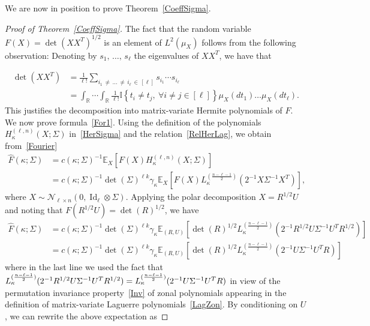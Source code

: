 \documentclass[AHL,Unicode,longabstracts,published]{cedram}
\DeclareMathOperator{\Id}{Id}
\newcommand{\scN}{\mathscr{N}}
\newcommand{\R}{\mathbb{R}}
\newcommand{\EX}[2]{\mathbb{E}_{#1}\left[#2\right]}
\newcommand{\ind}[1]{\mathbb{I}
\left\{#1\right\}}
\let\oldforall\forall
\renewcommand*{\forall}{\mathrel{\oldforall}}
\begin{document}
We are now in position to prove Theorem~\ref{CoeffSigma}.
\begin{proof}[Proof of Theorem~\ref{CoeffSigma}]
The fact that the random variable $F(X)= \det(XX^T)^{1/2}$ is an element of $L^2(\mu_X)$ follows from the following observation: Denoting by $s_1,\,\ldots,\,s_{\ell}$ the eigenvalues of $XX^T$, we have that

\break
\begin{align*}
\det\left(XX^T\right) &= \frac{1}{\ell!} \sum_{i_1\,\neq\,\ldots\,\neq\,i_{\ell}\,\in\,[\ell]} s_{i_1} \cdots s_{i_{\ell}}\\ &= \int_{\R}\cdots \int_{\R}
\frac{1}{\ell!} \ind{t_i \neq t_j, \ \forall i\neq j \in [\ell] }
\mu_X(dt_1)\ldots\mu_X(dt_{\ell}).
\end{align*}
This justifies the decomposition into matrix-variate Hermite polynomials of $F$. We now prove formula~\eqref{For1}. Using the definition of the polynomials $H_{\kappa}^{(\ell,n)}(X;\Sigma)$ in~\eqref{HerSigma} and the relation~\eqref{RelHerLag}, we obtain from~\eqref{Fourier}
\begin{align*}
\widehat{F}(\kappa; \Sigma) &= c(\kappa;\Sigma)^{-1}
\EX{X}{F(X) H^{(\ell,n)}_{\kappa}(X;\Sigma)} \\
&= c(\kappa;\Sigma)^{-1} \det(\Sigma)^{\ell k} \gamma_{\kappa}
\EX{X}{F(X) L_{\kappa}^{\left(\frac{n-\ell-1}{2}\right)}\left(2^{-1}X\Sigma^{-1}X^T\right)},
\end{align*}
where $X \sim \scN_{\ell\times n}(0,\Id_{\ell}\otimes \Sigma)$. Applying the polar decomposition $X= R^{1/2}U$ and noting that $F(R^{1/2}U)=\det(R)^{1/2}$, we have
\begin{align*}
\widehat{F}(\kappa; \Sigma) &= c(\kappa;\Sigma)^{-1} \det(\Sigma)^{\ell k} \gamma_{\kappa}
\EX{(R,U)}{ \det(R)^{1/2} L_{\kappa}^{\left(\frac{n-\ell-1}{2}\right)}\left(2^{-1}R^{1/2}U\Sigma^{-1}U^TR^{1/2}\right) } \\
&= c(\kappa;\Sigma)^{-1} \det(\Sigma)^{\ell k} \gamma_{\kappa}
\EX{(R,U)}{ \det(R)^{1/2} L_{\kappa}^{\left(\frac{n-\ell-1}{2}\right)}\left(2^{-1}U\Sigma^{-1}U^TR\right) }
\end{align*}
where in the last line we used the fact that $L_{\kappa}^{(\frac{n-\ell-1}{2})}(2^{-1}R^{1/2}U\Sigma^{-1}U^TR^{1/2}) =L_{\kappa}^{(\frac{n-\ell-1}{2})}\linebreak(2^{-1}U\Sigma^{-1}U^TR)$ in view of the permutation invariance property~\eqref{Inv} of zonal polynomials appearing in the definition of matrix-variate Laguerre polynomials~\eqref{LagZon}. By conditioning on $U$, we can rewrite the above expectation as

\end{proof}
\end{document}
